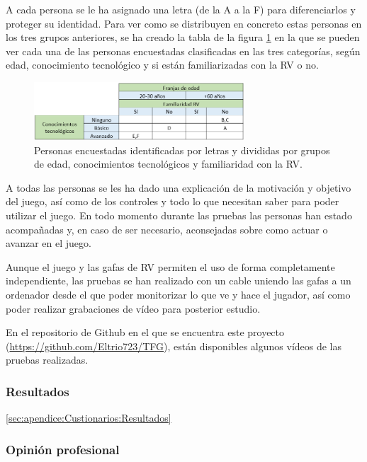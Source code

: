 A cada persona se le ha asignado una letra (de la A a la F) para diferenciarlos y proteger su identidad. Para ver como se distribuyen en concreto estas personas en los tres grupos anteriores, se ha creado la tabla de la figura \ref{fig:tablaPersonasLetras} en la que se pueden ver cada una de las personas encuestadas clasificadas en las tres categorías, según edad, conocimiento tecnológico y si están familiarizadas con la RV o no.




\begin{figure}
	\centering
	\includegraphics[width=0.7\textwidth]{04.Desarrollo/05.Entrega5/02.Iteracion5_2/00.Figuras/02.tabla_personas_letras.png}
	\caption{Personas encuestadas identificadas por letras y divididas por grupos de edad, conocimientos tecnológicos y familiaridad con la RV.}
	\label{fig:tablaPersonasLetras}
\end{figure}


A todas las personas se les ha dado una explicación de la motivación y objetivo del juego, así como de los controles y todo lo que necesitan saber para poder utilizar el juego. En todo momento durante las pruebas las personas han estado acompañadas y, en caso de ser necesario, aconsejadas sobre como actuar o avanzar en el juego.

Aunque el juego y las gafas de RV permiten el uso de forma completamente independiente, las pruebas se han realizado con un cable uniendo las gafas a un ordenador desde el que poder monitorizar lo que ve y hace el jugador, así como poder realizar grabaciones de vídeo para posterior estudio.


En el repositorio de Github en el que se encuentra este proyecto (\url{https://github.com/Eltrio723/TFG}), están disponibles algunos vídeos de las pruebas realizadas.


\subsubsection{Resultados}




\ref{sec:apendice:Custionarios:Resultados}








\subsubsection{Opinión profesional}











